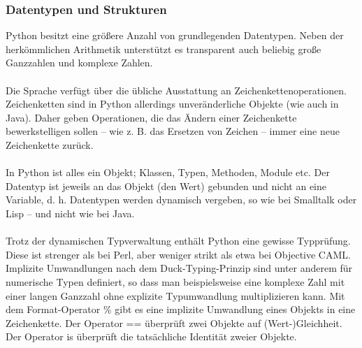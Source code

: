 \subsubsection{Datentypen und Strukturen}
Python besitzt eine größere Anzahl von grundlegenden Datentypen. Neben der herkömmlichen Arithmetik unterstützt es transparent auch beliebig große Ganzzahlen und komplexe Zahlen.\\
\\
Die Sprache verfügt über die übliche Ausstattung an Zeichenkettenoperationen. Zeichenketten sind in Python allerdings unveränderliche Objekte (wie auch in Java). Daher geben Operationen, die das Ändern einer Zeichenkette bewerkstelligen sollen – wie z. B. das Ersetzen von Zeichen – immer eine neue Zeichenkette zurück.\\
\\
In Python ist alles ein Objekt; Klassen, Typen, Methoden, Module etc. Der Datentyp ist jeweils an das Objekt (den Wert) gebunden und nicht an eine Variable, d. h. Datentypen werden dynamisch vergeben, so wie bei Smalltalk oder Lisp – und nicht wie bei Java.\\
\\
Trotz der dynamischen Typverwaltung enthält Python eine gewisse Typprüfung. Diese ist strenger als bei Perl, aber weniger strikt als etwa bei Objective CAML. Implizite Umwandlungen nach dem Duck-Typing-Prinzip sind unter anderem für numerische Typen definiert, so dass man beispielsweise eine komplexe Zahl mit einer langen Ganzzahl ohne explizite Typumwandlung multiplizieren kann. Mit dem Format-Operator \% gibt es eine implizite Umwandlung eines Objekts in eine Zeichenkette. Der Operator == überprüft zwei Objekte auf (Wert-)Gleichheit. Der Operator is überprüft die tatsächliche Identität zweier Objekte.


